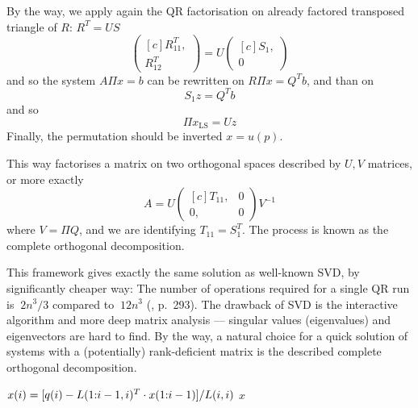 \begin{refsection}
By the way, we apply again the QR factorisation on already factored
transposed triangle of $R$: $R^T = US$
\begin{equation}
  \begin{pmatrix*}[c]
    R_{11}^T,\\
    R_{12}^T
  \end{pmatrix*}
  = U
  \begin{pmatrix*}[c]
    S_1,\\
    0
  \end{pmatrix*}
\end{equation}
and so the system $A \Pi  x=b$ can be rewritten on $R \Pi x = Q^T b$,
and than on
\begin{equation}
  S_1 z = Q^T b
\end{equation}
and so
\begin{equation}
  \Pi x_{\mathrm{LS}} = U z
\end{equation}
Finally, the permutation should be inverted $x = u(p).$

This way factorises a matrix on two orthogonal spaces described
by $U,V$ matrices, or more exactly
\begin{equation}
  A = U
  \begin{pmatrix*}[c]
    T_{11}, & 0\\
    0, & 0
  \end{pmatrix*}
  V^{-1}
\end{equation}
where $V = \Pi Q$, and we are identifying $T_{11} = S_1^T$.
The process is known as the complete orthogonal decomposition.

This framework gives exactly the same solution as well-known SVD,
by significantly cheaper way: The number of operations required
for a single QR run is $~2 n^3/3$ compared to $~12n^3$
(\cite{golub2013matrix}, p.~293). The drawback of SVD
is the interactive algorithm and more deep matrix analysis ---
singular values (eigenvalues) and eigenvectors are hard to find.
By the way, a natural choice for a quick solution of systems with
a (potentially) rank-deficient matrix is the described complete
orthogonal decomposition.


\begin{algorithm}
  \caption{Solution of $Lx=q$ with back-substitution}
  \label{alg:lsol}
  \begin{algorithmic}
    \State {}

    \State $x(i) = [q(i) - L(1{:}i-1,i)^T \cdot x(1{:}i-1)] / L(i,i)$
    \EndFor
    \State \Return $x$
    \EndFunction
  \end{algorithmic}
\end{algorithm}


\end{refsection}
